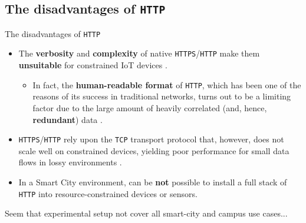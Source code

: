 \documentclass[10pt]{beamer}
\begin{document}
\subsection{The disadvantages of \texttt{HTTP}}
\begin{frame}{The disadvantages of \texttt{HTTP}}

\begin{itemize}
\justifying
\item The \textbf{verbosity} and \textbf{complexity} of native \texttt{HTTPS}/\texttt{HTTP} make them \textbf{unsuitable} for constrained IoT devices \cite{IOTCITY}. 

\begin{itemize}
\justifying
\item In fact, the \textbf{human-readable format} of \texttt{HTTP}, which has been one of the reasons of its success in traditional networks, turns out to be a limiting factor due to the large amount of heavily correlated (and, hence, \textbf{redundant}) data \cite{IOTCITY}.
\end{itemize}

\item \texttt{HTTPS}/\texttt{HTTP} rely upon the \texttt{TCP} transport protocol that, however, does not scale well on constrained devices, yielding poor performance for small data flows in lossy environments \cite{IOTCITY}.

\item In a Smart City environment, can be \textbf{not} possible to install a full stack of \texttt{HTTP} into resource-constrained devices or sensors. 
\end{itemize}

\begin{block}{}
\justifying
Seem that experimental setup not cover all smart-city and campus use cases...
\end{block}

\end{frame} 
\end{document}
